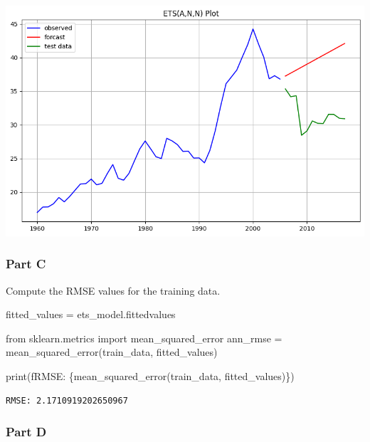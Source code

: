 \documentclass[
  11pt,
]{article}
\newenvironment{Shaded}{\begin{snugshade}}{\end{snugshade}}
\newcommand{\BuiltInTok}[1]{\textcolor[rgb]{0.00,0.23,0.31}{#1}}
\newcommand{\ImportTok}[1]{\textcolor[rgb]{0.00,0.46,0.62}{#1}}
\newcommand{\NormalTok}[1]{\textcolor[rgb]{0.00,0.23,0.31}{#1}}
\newcommand{\OperatorTok}[1]{\textcolor[rgb]{0.37,0.37,0.37}{#1}}
\newcommand{\SpecialCharTok}[1]{\textcolor[rgb]{0.37,0.37,0.37}{#1}}
\newcommand{\SpecialStringTok}[1]{\textcolor[rgb]{0.13,0.47,0.30}{#1}}
\begin{document}
\includegraphics{hw5_files/figure-pdf/cell-17-output-1.png}

\subsubsection{Part C}\label{part-c}

Compute the RMSE values for the training data.

\begin{Shaded}
\begin{Highlighting}[]

\NormalTok{fitted\_values }\OperatorTok{=}\NormalTok{ ets\_model.fittedvalues}
\end{Highlighting}
\end{Shaded}

\begin{Shaded}
\begin{Highlighting}[]
\ImportTok{from}\NormalTok{ sklearn.metrics }\ImportTok{import}\NormalTok{ mean\_squared\_error}
\NormalTok{ann\_rmse }\OperatorTok{=}\NormalTok{ mean\_squared\_error(train\_data, fitted\_values)}

\BuiltInTok{print}\NormalTok{(}\SpecialStringTok{f\textquotesingle{}RMSE: }\SpecialCharTok{\{}\NormalTok{mean\_squared\_error(train\_data, fitted\_values)}\SpecialCharTok{\}}\SpecialStringTok{\textquotesingle{}}\NormalTok{)}
\end{Highlighting}
\end{Shaded}

\begin{verbatim}
RMSE: 2.1710919202650967
\end{verbatim}

\subsubsection{Part D}\label{part-d}
\end{document}

